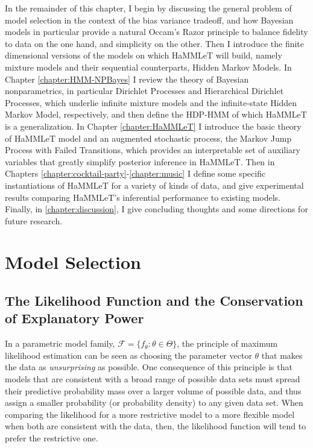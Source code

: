 In the remainder of this chapter, I begin by discussing the general
problem of model selection in the context of the bias variance
tradeoff, and how Bayesian models in particular provide a natural
Occam's Razor principle to balance fidelity to data on the one hand,
and simplicity on the other.  Then I introduce the finite dimensional
versions of the models on which HaMMLeT will build, namely mixture
models and their sequential counterparts, Hidden Markov Models.  In
Chapter \ref{chapter:HMM-NPBayes} I review the theory of Bayesian
nonparametrics, in particular Dirichlet Processes and Hierarchical
Dirichlet Processes, which underlie infinite mixture models and the
infinite-state Hidden Markov Model, respectively, and then define the
HDP-HMM of which HaMMLeT is a generalization.  In Chapter
\ref{chapter:HaMMLeT} I introduce the basic theory of HaMMLeT model
and an augmented stochastic process, the Markov Jump Process with
Failed Transitions, which provides an interpretable set of auxiliary
variables that greatly simplify posterior inference in HaMMLeT.  Then
in Chapters \ref{chapter:cocktail-party}-\ref{chapter:music} I define
some specific instantiations of HaMMLeT for a variety of kinds of
data, and give experimental results comparing HaMMLeT's inferential
performance to existing models.  Finally, in
\ref{chapter:discussion}, I give concluding thoughts and some
directions for future research.

\section{Model Selection}
\label{sec:model-selection}

\subsection{The Likelihood Function and the Conservation of
  Explanatory Power}
\label{sec:bayes-occams-razor}

In a parametric model family, $\mathcal{F} = \{f_{\theta}: \theta \in
\Theta\}$, the principle of maximum likelihood estimation can be seen
as choosing the parameter vector $\theta$ that makes the data as {\em unsurprising} 
as possible.  One consequence of this principle is that models that
are consistent with a broad range of possible data sets must spread
their predictive probability mass over a larger volume of possible
data, and thus assign a smaller probability (or probability density)
to any given data set.  When comparing the likelihood for a more
restrictive model to a more flexible model when both are consistent
with the data, then, the likelihood function will tend to prefer the
restrictive one.

